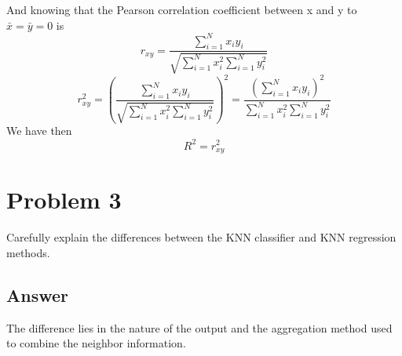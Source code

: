 \documentclass[conference, onecolumn]{IEEEtran}
\begin{document}
	And knowing that the Pearson correlation coefficient between x and y to $\bar{x} = \bar{y} = 0$ is
	\begin{equation}
		r_{xy} = \frac{\sum_{i=1}^{N} x_i y_i}{\sqrt{\sum_{i=1}^{N} x_i^2 \sum_{i=1}^{N} y_i^2}}
	\end{equation}
	\begin{equation}
		r_{xy}^2 = (\frac{\sum_{i=1}^{N} x_i y_i}{\sqrt{\sum_{i=1}^{N} x_i^2 \sum_{i=1}^{N} y_i^2}})^2 = \frac{(\sum_{i=1}^{N} x_i y_i)^2}{\sum_{i=1}^{N} x_i^2 \sum_{i=1}^{N} y_i^2}
	\end{equation}
	We have then
	\begin{equation}
		R^2 = r_{xy}^2
	\end{equation}
	
	\section*{Problem 3}
	Carefully explain the differences between the KNN classifier and KNN regression methods.
	
	\subsection*{Answer}
	The difference lies in the nature of the output and the aggregation method used to combine the neighbor information.
	
\end{document}
